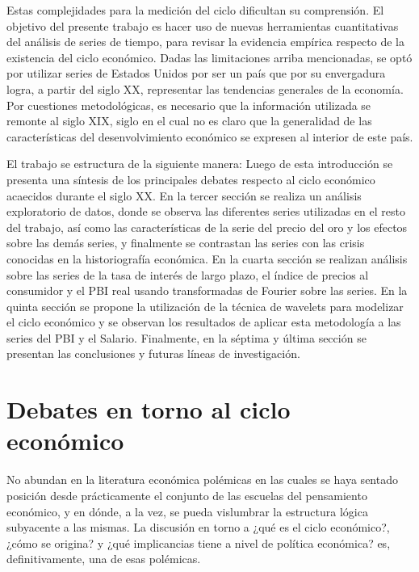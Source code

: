 \documentclass[a4paper]{article}
\begin{document}
Estas complejidades para la medición del ciclo dificultan su comprensión. El objetivo del presente trabajo es hacer uso de nuevas herramientas cuantitativas del análisis de series de tiempo, para revisar la evidencia empírica respecto de la existencia del ciclo económico. Dadas las limitaciones arriba mencionadas, se optó por utilizar series de Estados Unidos por ser un país que por su envergadura logra, a partir del siglo XX, representar las tendencias generales de la economía. Por cuestiones metodológicas, es necesario que la información utilizada se remonte al siglo XIX, siglo en el cual no es claro que la generalidad de las características del desenvolvimiento económico se expresen al interior de este país. 

El trabajo se estructura de la siguiente manera: Luego de esta introducción se presenta una síntesis de los principales debates respecto al ciclo económico acaecidos durante el siglo XX. En la tercer sección se realiza un análisis exploratorio de datos, donde se observa las diferentes series utilizadas en el resto del trabajo, así como las características de la serie del precio del oro y los efectos sobre las demás series, y finalmente se contrastan las series  con las crisis conocidas en la historiografía económica. En la cuarta sección se realizan análisis sobre las series de la tasa de interés de largo plazo, el índice de precios al consumidor y el PBI real usando transformadas de Fourier sobre las series. En la quinta sección se propone la utilización de la técnica de wavelets para modelizar el ciclo económico y se observan los resultados de aplicar esta metodología a las series del PBI y el Salario. Finalmente, en la séptima y última sección se presentan las conclusiones y futuras líneas de investigación.


\section{Debates en torno al ciclo económico}

No abundan en la literatura económica polémicas en las cuales se haya sentado posición desde prácticamente el conjunto de las escuelas del pensamiento económico, y en dónde, a la vez, se pueda vislumbrar la estructura lógica subyacente a las mismas. La discusión en torno a ¿qué es el ciclo económico?, ¿cómo se origina?  y ¿qué implicancias tiene a nivel de política económica? es, definitivamente, una de esas polémicas.
\end{document}
